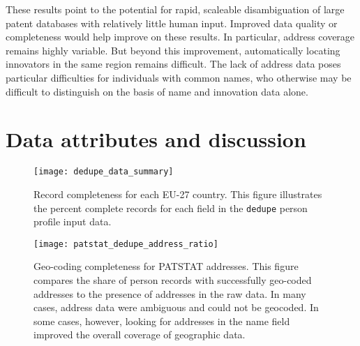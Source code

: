 \documentclass[11pt]{article}
\begin{document}
These results point to the potential for rapid, scaleable
disambiguation of large patent databases with relatively little human
input. Improved data quality or completeness would help improve on
these results. In particular, address coverage remains highly
variable. But beyond this improvement, automatically
locating innovators in the same region remains difficult. The lack of
address data poses particular difficulties for individuals with common
names, who otherwise may be difficult to distinguish on the basis of
name and innovation data alone.








\appendix

\section{Data attributes and discussion}
\label{sec:data-attr-disc}

\begin{figure}[ht]
  \centering
  \texttt{[image: dedupe\_data\_summary]}
  \caption{Record completeness for each EU-27 country. This figure illustrates the percent complete records for each field in the \texttt{dedupe} person profile input data. }
  \label{fig:profile-completeness}
\end{figure}

\begin{figure}[ht]
  \centering
  \texttt{[image: patstat\_dedupe\_address\_ratio]}
  \caption{Geo-coding completeness for PATSTAT addresses. This figure compares the share of person records with successfully geo-coded addresses to the presence of addresses in the raw data. In many cases, address data were ambiguous and could not be geocoded. In some cases, however, looking for addresses in the name field improved the overall coverage of geographic data. }
  \label{fig:addr-geocoded-shares}
\end{figure}
\end{document}
